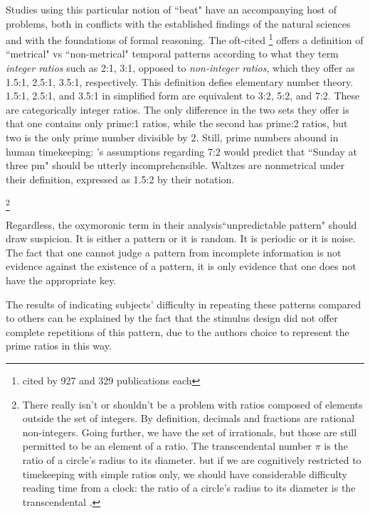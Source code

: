 Studies using this particular notion of ``beat" have an accompanying host of problems, both in conflicts with the established findings of the natural sciences and with the foundations of formal reasoning. The oft-cited \citep{essensPovel1985a, essensPovel1985b}\footnote{cited by 927 and 329 publications each} offers a definition of ``metrical" vs ``non-metrical" temporal patterns according to what they term {\it integer ratios} such as 2:1, 3:1, opposed to {\it non-integer ratios}, which they offer as 1.5:1, 2.5:1, 3.5:1, respectively. 
This definition defies elementary number theory.
1.5:1, 2.5:1, and 3.5:1 in simplified form are equivalent to 3:2, 5:2, and 7:2. 
These are categorically integer ratios. The only difference in the two sets they offer is that one contains only prime:1 ratios, while the second has prime:2 ratios, but two is the only prime number divisible by 2. 
 Still, prime numbers abound in human timekeeping:  \citep{essensPovel985}'s assumptions regarding 7:2 would predict that ``Sunday at three pm" should be utterly incomprehensible. 
Waltzes are nonmetrical under their definition, expressed as 1.5:2 by their notation. 

\footnote{ There really isn't or shouldn't be a problem with ratios composed of elements outside the set of integers. By definition, decimals and fractions are rational non-integers. Going further, we have the set of irrationals, but those are still permitted to be an element of a ratio. The transcendental number $\pi$ is the ratio of a circle's radius to its diameter.
but if we are cognitively restricted to timekeeping with simple ratios only, we should have considerable difficulty reading time from a clock: the ratio of a circle's radius to its diameter is the transcendental \pi.  } 

Regardless, the oxymoronic term in their analysis``unpredictable pattern" should draw suspicion. It is either a pattern or it is random. It is periodic or it is noise. The fact that one cannot judge a pattern from incomplete information is not evidence against the existence of a pattern, it is only evidence that one does not have the appropriate key. 



The results of \citep{essensPovel1985} indicating subjects' difficulty in repeating these patterns compared to others can be explained by the fact that the stimulus design did not offer complete repetitions of this pattern, due to the authors choice to represent the prime ratios in this way. 




